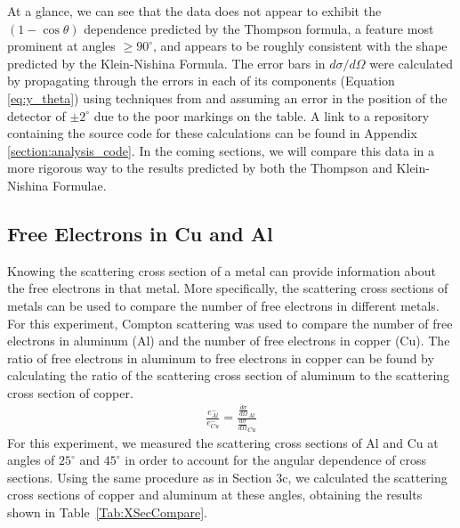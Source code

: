 \documentclass[%
 reprint,
 amsmath,amssymb,
 aps,
 pra,
]{revtex4-1}
\begin{document}
\noindent At a glance, we can see that the data does not appear to exhibit the $(1 - \cos{\theta})$ dependence predicted by the Thompson formula, a feature most prominent at angles $\ge 90^\circ$, and appears to be roughly consistent with the shape predicted by the Klein-Nishina Formula. The error bars in $d \sigma / d\Omega$ were calculated by propagating through the errors in each of its components (Equation \ref{eq:y_theta}) using techniques from \cite{bevington} and assuming an error in the position of the detector of $\pm 2^\circ$ due to the poor markings on the table. A link to a repository containing the source code for these calculations can be found in Appendix \ref{section:analysis_code}. In the coming sections, we will compare this data in a more rigorous way to the results predicted by both the Thompson and Klein-Nishina Formulae.

\subsection{Free Electrons in Cu and Al}

Knowing the scattering cross section of a metal can provide information about the free electrons in that metal. More specifically, the scattering cross sections of metals can be used to compare the number of free electrons in different metals. For this experiment, Compton scattering was used to compare the number of free electrons in aluminum (Al) and the number of free electrons in copper (Cu). The ratio of free electrons in aluminum to free electrons in copper can be found by calculating the ratio of the scattering cross section of aluminum to the scattering cross section of copper.
\begin{gather}
\frac{e^{-}_{Al}}{e^{-}_{Cu}} = \frac{\frac{d\sigma}{d\Omega}_{Al}}{\frac{d\sigma}{d\Omega}_{Cu}}
\end{gather}
For this experiment, we measured the scattering cross sections of Al and Cu at angles of $25^{\circ}$ and $45^{\circ}$ in order to account for the angular dependence of cross sections. Using the same procedure as in Section 3c, we calculated the scattering cross sections of copper and aluminum at these angles, obtaining the results shown in Table~\ref{Tab:XSecCompare}. 
\end{document}
